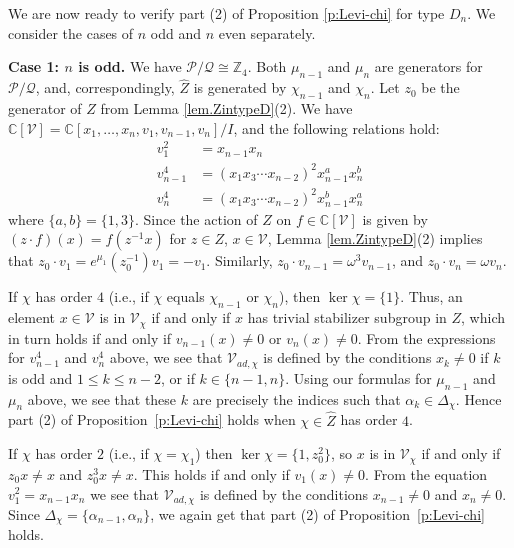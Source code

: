\documentclass[reqno,11pt]{amsart}
\theoremstyle{remark}
\theoremstyle{remark}
\theoremstyle{definition}
\theoremstyle{definition}
\theoremstyle{definition}
\numberwithin{equation}{section}
\newcommand{\C}{\mathbb{C}}           %
\newcommand{\Z}{\mathbb{ Z}}           %
\renewcommand{\ker}{\operatorname{ker }}
\newcommand{\ga}{\alpha}
\newcommand{\cp}{\mathcal{P}}
\newcommand{\cq}{\mathcal{Q}}
\newcommand{\toric}{\mathcal{V}}
\renewcommand{\hat}{\widehat}
\begin{document}
We are now ready to verify part (2) of Proposition \ref{p:Levi-chi} for type $D_n$.  We consider the cases of $n$ odd and $n$ even separately. 

\textbf{Case 1: $n$ is odd.} We have $\cp/\cq \cong \Z_4$. Both ${\mu}_{n-1}$ and ${\mu}_n$ are generators for $\cp/\cq$, and, correspondingly, $\hat{Z}$ is generated by $\chi_{n-1}$ and $\chi_n$.  
Let $z_0$ be the generator of $Z$ from Lemma \ref{lem.ZintypeD}(2). We have $\C[\toric] = \C[x_1, \ldots, x_n, v_1, v_{n-1}, v_{n}]/I$, and the following relations hold:
\begin{align*} 
v_1^2 & =  x_{n-1} x_n \\
v_{n-1}^4 & =  (x_1 x_3 \cdots x_{n-2})^2 x_{n-1}^a x_n^b \\
v_{n}^4 & =  (x_1 x_3 \cdots x_{n-2})^2 x_{n-1}^b x_n^a
\end{align*}
where $\{a,b \} = \{ 1,3 \}$.
Since the action of $Z$ on $f \in \C[\toric]$ is given by $(z \cdot f)(x) = f(z^{-1} x)$ for $z \in Z$, $x \in \toric$, Lemma \ref{lem.ZintypeD}(2) implies that $z_0 \cdot v_1 = e^{\mu_1}(z_0^{-1}) v_1 = - v_1$.  Similarly, $z_0 \cdot v_{n-1} = \omega^3 v_{n-1}$, and $z_0 \cdot v_n = \omega v_n$. 

If $\chi$ has order $4$ (i.e., if $\chi$ equals $\chi_{n-1}$ or $\chi_n$), then $\ker \chi = \{ 1 \}$.  Thus, an element $x \in \toric$ is in $\toric_{\chi}$ if and only if $x$ has trivial stabilizer subgroup in $Z$, which in turn holds if and only if $v_{n-1}(x)\neq 0$ or $v_{n}(x)\neq 0$.
From the expressions for $v_{n-1}^4$ and $v_n^4$ above, we see that $\toric_{ad, \chi}$ is defined by the conditions $x_k \neq 0$ if $k$ is odd and $1\leq k \leq n-2$, or if $k \in  \{ n-1, n \}$.  Using our formulas for $\mu_{n-1}$ and $\mu_n$ above, we see that these $k$ are precisely the indices such that $\ga_k \in \Delta_{\chi}$.  Hence part (2) of Proposition~\ref{p:Levi-chi} holds when $\chi\in \hat{Z}$ has order $4$. 


If $\chi$ has order $2$ (i.e., if $\chi = \chi_1$) then $\ker \chi = \{1, z_0^2 \}$, so $x$ is in $\toric_{\chi}$ if and only if $z_0 x \neq x$ and $z_0^3 x \neq x$.  This holds if and only if $v_1(x) \neq 0$.   From the equation $v_1^2  =  x_{n-1} x_n$ we see that $\toric_{ad, \chi}$ is defined by the conditions $x_{n-1}\neq 0$ and  $x_n \neq 0$.  Since $\Delta_{\chi} = \{ \alpha_{n-1}, \alpha_n \}$, we again get that part (2) of Proposition~\ref{p:Levi-chi} holds. 
\end{document}
